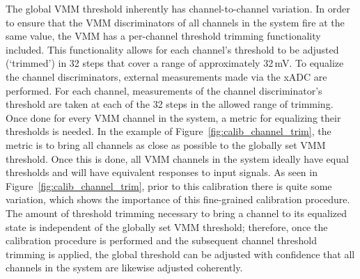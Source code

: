 The global VMM threshold inherently has channel-to-channel variation.
In order to ensure that the VMM discriminators of all channels in the system
fire at the same value, the VMM has a per-channel threshold trimming functionality included.
This functionality allows for each channel's threshold to be adjusted (`trimmed') in 32 steps that cover a range
of approximately 32\,mV.
To equalize the channel discriminators, external measurements made via the xADC are performed.
For each channel, measurements of the channel discriminator's threshold are taken at each of the 32
steps in the allowed range of trimming.
Once done for every VMM channel in the system, a metric for equalizing their thresholds is needed.
In the example of Figure~\ref{fig:calib_channel_trim}, the metric is to bring all channels
as close as possible to the globally set VMM threshold.
Once this is done, all VMM channels in the system ideally have equal thresholds and will
have equivalent responses to input signals.
As seen in Figure~\ref{fig:calib_channel_trim}, prior to this calibration there is quite
some variation, which shows the importance of this fine-grained calibration procedure.
The amount of threshold trimming necessary to bring a channel to its equalized state
is independent of the globally set VMM threshold; therefore, once the calibration procedure
is performed and the subsequent channel threshold trimming is applied, the global
threshold can be adjusted with confidence that all channels in the system are likewise adjusted coherently.

